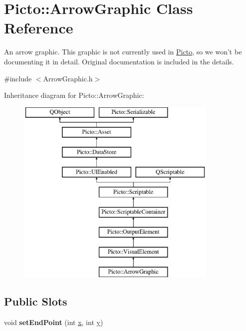 \hypertarget{class_picto_1_1_arrow_graphic}{\section{Picto\-:\-:Arrow\-Graphic Class Reference}
\label{class_picto_1_1_arrow_graphic}
}


An arrow graphic. This graphic is not currently used in \hyperlink{namespace_picto}{Picto}, so we won't be documenting it in detail. Original documentation is included in the details.  




{\ttfamily \#include $<$Arrow\-Graphic.\-h$>$}

Inheritance diagram for Picto\-:\-:Arrow\-Graphic\-:\begin{figure}[H]
\begin{center}
\leavevmode
\includegraphics[height=9.000000cm]{class_picto_1_1_arrow_graphic}
\end{center}
\end{figure}
\subsection*{Public Slots}
\begin{DoxyCompactItemize}
\item 
\hypertarget{class_picto_1_1_arrow_graphic_a8b45ee34c108dc49cc978461d9f5cdda}{void {\bfseries set\-End\-Point} (int \hyperlink{struct_picto_1_1_visual_element_a1b50bc5fa41868f661687015be3c97e8}{x}, int \hyperlink{struct_picto_1_1_visual_element_a9a4db3430219e1f78208eda1a89e9f38}{y})}\label{class_picto_1_1_arrow_graphic_a8b45ee34c108dc49cc978461d9f5cdda}

\end{DoxyCompactItemize}
